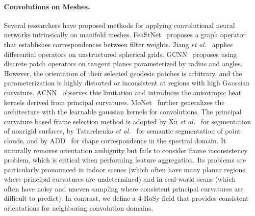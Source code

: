 \paragraph*{Convolutions on Meshes.}
Several researchers have proposed methods for applying convolutional neural networks intrinsically on manifold meshes.  FeaStNet~\cite{verma2018feastnet} proposes a graph operator that establishes correspondences between filter weights. Jiang \textit{et al.}~\cite{jiang2019spherical} applies differential operators on unstructured spherical grids.
GCNN~\cite{masci2015geodesic} proposes using discrete patch operators on tangent planes parameterized by radius and angles. 
However, the orientation of their selected geodesic patches is arbitrary, and the parameterization is highly distorted or inconsistent at regions with high Gaussian curvature. 
ACNN~\cite{boscaini2016learning} observes this limitation and introduces the anisotropic heat kernels derived from principal curvatures. MoNet~\cite{monti2017geometric} further generalizes the architecture with the learnable gaussian kernels for convolutions.
The principal curvature based frame selection method is adopted by Xu \textit{et al.}~\cite{xu2017directionally} for segmentation of nonrigid surfaces, by Tatarchenko \textit{et al.}~\cite{tatarchenko2018tangent} for semantic segmentation of point clouds, and by ADD~\cite{boscaini2016anisotropic} for shape correspondence in the spectral domain. 
It naturally removes orientation ambiguity but fails to consider frame inconsistency problem, which is critical when performing feature aggregation.  Its problems are particularly pronounced in indoor scenes (which often have many planar regions where principal curvatures are undetermined) and in real-world scans (which often have noisy and uneven sampling where consistent principal curvatures are difficult to predict).   In contrast, we define a 4-RoSy field that provides consistent orientations for neighboring convolution domains.

